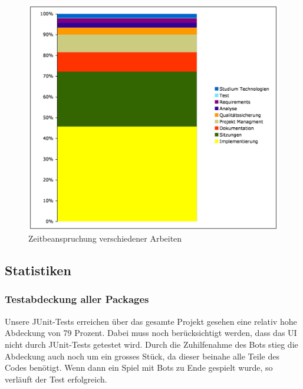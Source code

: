 \documentclass[12pt,halfparskip]{scrartcl}
\begin{document}
\begin{figure}[h]
	\centering
	\includegraphics[width=0.8 \textwidth]{zeitbeachspruchung_arbeiten}
	\caption{Zeitbeanspruchung verschiedener Arbeiten}
	\label{fig:zeitbeachspruchung_arbeiten}
\end{figure}

\subsection{Statistiken}
\subsubsection{Testabdeckung aller Packages}
Unsere JUnit-Tests erreichen über das gesamte Projekt gesehen eine relativ hohe Abdeckung von 79 Prozent. Dabei muss noch berücksichtigt werden, dass das UI nicht durch JUnit-Tests getestet wird. Durch die Zuhilfenahme des Bots stieg die Abdeckung auch noch um ein grosses Stück, da dieser beinahe alle Teile des Codes benötigt. Wenn dann ein Spiel mit Bots zu Ende gespielt wurde, so verläuft der Test erfolgreich.
\end{document}
